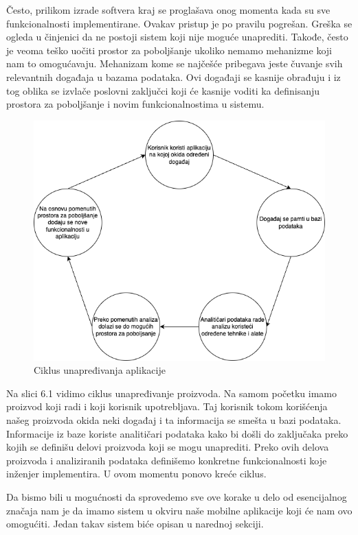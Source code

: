 \documentclass[12pt,oneside]{memoir}
\begin{document}
Često, prilikom izrade softvera kraj se proglašava onog momenta kada su sve funkcionalnosti implementirane. Ovakav pristup je po pravilu pogrešan. Greška se ogleda u činjenici da ne postoji sistem koji nije moguće unaprediti. Takođe, često je veoma teško uočiti prostor za poboljšanje ukoliko nemamo mehanizme koji nam to omogućavaju. Mehanizam kome se najčešće pribegava jeste čuvanje svih relevantnih događaja u bazama podataka. Ovi događaji se kasnije obrađuju i iz tog oblika se izvlače poslovni zaključci koji će kasnije voditi ka definisanju prostora za poboljšanje i novim funkcionalnostima u sistemu.

\begin{figure}[h!]
\centering
\includegraphics[scale=0.5]{docs/images/chapterSix/dataFlow.png}
\caption{Ciklus unapređivanja aplikacije}
\label{fig:dataFlow}
\end{figure}

Na slici 6.1 vidimo ciklus unapređivanje proizvoda. Na samom početku imamo proizvod koji radi i koji korisnik upotrebljava. Taj korisnik tokom korišćenja našeg proizvoda okida neki događaj i ta informacija se smešta u bazi podataka. Informacije iz baze koriste analitičari podataka kako bi došli do zaključaka preko kojih se definišu delovi proizvoda koji se mogu unaprediti. Preko ovih delova proizvoda i analiziranih podataka definišemo konkretne funkcionalnosti koje inženjer implementira. U ovom momentu ponovo kreće ciklus.

Da bismo bili u mogućnosti da sprovedemo sve ove korake u delo od esencijalnog značaja nam je da imamo sistem u okviru naše mobilne aplikacije koji će nam ovo omogućiti. Jedan takav sistem biće opisan u narednoj sekciji.
\end{document}
